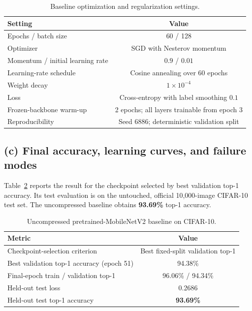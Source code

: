 \documentclass[12pt,a4paper]{article}
\begin{document}
\begin{table}[H]
    \centering
    \small
    \caption{Baseline optimization and regularization settings.}
    \label{tab:q1-training}
    \begin{tabular}{lc}
        \toprule
        Setting & Value \\
        \midrule
        Epochs / batch size & 60 / 128 \\
        Optimizer & SGD with Nesterov momentum \\
        Momentum / initial learning rate & $0.9$ / $0.01$ \\
        Learning-rate schedule & Cosine annealing over 60 epochs \\
        Weight decay & $1\times10^{-4}$ \\
        Loss & Cross-entropy with label smoothing $0.1$ \\
        Frozen-backbone warm-up & 2 epochs; all layers trainable from epoch 3 \\
        Reproducibility & Seed 6886; deterministic validation split \\
        \bottomrule
    \end{tabular}
\end{table}

\subsection{(c) Final accuracy, learning curves, and failure modes}

Table~\ref{tab:baseline-results} reports the result for the checkpoint selected
by best validation top-1 accuracy. Its test evaluation is on the untouched,
official 10,000-image CIFAR-10 test set. The uncompressed baseline obtains
\textbf{93.69\%} top-1 accuracy.

\begin{table}[H]
    \centering
    \small
    \caption{Uncompressed pretrained-MobileNetV2 baseline on CIFAR-10.}
    \label{tab:baseline-results}
    \begin{tabular}{lc}
        \toprule
        Metric & Value \\
        \midrule
        Checkpoint-selection criterion & Best fixed-split validation top-1 \\
        Best validation top-1 accuracy (epoch 51) & 94.38\% \\
        Final-epoch train / validation top-1 & 96.06\% / 94.34\% \\
        Held-out test loss & 0.2686 \\
        Held-out test top-1 accuracy & \textbf{93.69\%} \\
        \bottomrule
    \end{tabular}
\end{table}
\end{document}
